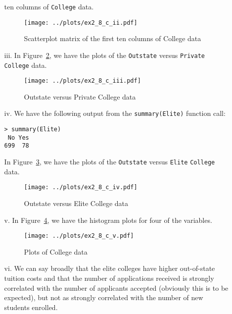 \begin{itemize}
\begin{itemize}
            ten columns of \verb|College| data.
        \begin{figure}[!ht]
            \texttt{[image: ../plots/ex2\_8\_c\_ii.pdf]}
            \caption{Scatterplot matrix of the first ten columns of College data \label{fig2_8scat}}
        \end{figure}
        \item[iii.] In Figure~\ref{fig2_8out}, we have the plots of the \verb|Outstate| versus 
        \verb|Private| \verb|College| data.
        \begin{figure}[!ht]
            \texttt{[image: ../plots/ex2\_8\_c\_iii.pdf]}
            \caption{Outstate versus Private College data \label{fig2_8out}}
        \end{figure}
        \item[iv.] We have the following output from the \verb|summary(Elite)| function call:
        \scriptsize\begin{verbatim}
> summary(Elite)
 No Yes 
699  78 
        \end{verbatim}\normalsize
        In Figure~\ref{fig2_8out2}, we have the plots of the \verb|Outstate| versus 
        \verb|Elite| \verb|College| data.
        \begin{figure}[!ht]
            \texttt{[image: ../plots/ex2\_8\_c\_iv.pdf]}
            \caption{Outstate versus Elite College data \label{fig2_8out2}}
        \end{figure}
        \item[v.] In Figure~\ref{fig2_8hist}, we have the histogram plots for four of the 
            variables.
        \begin{figure}[!ht]
            \texttt{[image: ../plots/ex2\_8\_c\_v.pdf]}
            \caption{Plots of College data \label{fig2_8hist}}
        \end{figure}
        \item[vi.] We can say broadly that the elite colleges have higher out-of-state tuition 
        costs and that the number of applications received is strongly correlated with the
        number of applicants accepted (obviously this is to be expected), but not as strongly
        correlated with the number of new students enrolled.
    \end{itemize}
\end{itemize}
